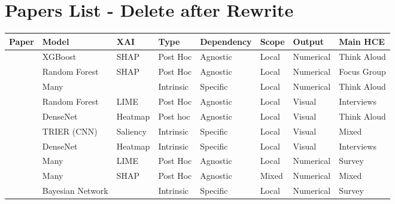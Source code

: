 \section{Papers List - Delete after Rewrite}

\iffalse
\begin{table*}
    \centering
    \begin{tabular}{|l|l|lllll|l|}
        \hline
         \textbf{Paper} & \textbf{Model} & \textbf{XAI} & \textbf{Type} &  \textbf{Dependency} & \textbf{Scope} & \textbf{Output} & \textbf{Main HCE} \\
        \hline        \cite{sivaraman2023ignore} & XGBoost & SHAP & Post Hoc  & Agnostic  &  Local  &  Numerical & Think Aloud \\
        
        \cite{barda2020qualitative} & Random Forest & SHAP & Post Hoc & Agnostic & Local & Numerical  & Focus Group  \\
        
        \cite{brennan2019comparing} & Many & & Intrinsic & Specific & Local & Numerical & Think Aloud  \\
        
        \cite{matthiesen2021clinician} & Random Forest & LIME & Post Hoc & Agnostic & Local & Visual & Interviews  \\
        
        \cite{ellenrieder2023promoting} & DenseNet & Heatmap & Post hoc & Agnostic & Local & Visual & Think Aloud  \\
        
        \cite{hwang2022clinical} & TRIER (CNN) & Saliency & Intrinsic & Specific & Local & Visual & Mixed  \\
        
        \cite{calisto2022breastscreening} & DenseNet & Heatmap &   Intrinsic & Specific & Local & Visual & Interviews  \\
        
        \cite{kumarakulasinghe2020evaluating} & Many & LIME & Post Hoc & Agnostic & Local & Numerical & Survey  \\
        
        \cite{kovalchuk2022three} & Many & SHAP & Post Hoc & Agnostic & Mixed & Numerical & Mixed  \\ 
        
        \cite{kyrimi2020incremental} & Bayesian Network &  & Intrinsic & Specific & Local & Numerical & Survey  \\ 
        

\end{tabular}
\end{table*}
